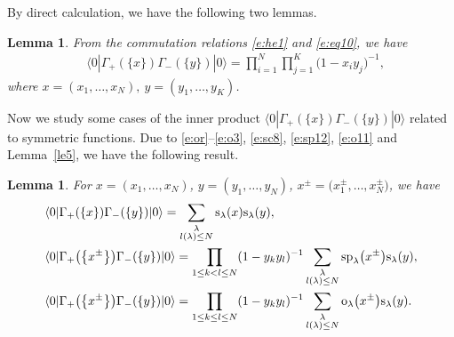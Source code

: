 \documentclass[pdftex]{sigma}
\numberwithin{equation}{section}
\newtheorem{Lemma}[Theorem]{Lemma}
\begin{document}
By direct calculation, we have the following two lemmas.
\begin{Lemma}\label{le} From the commutation relations \eqref{e:he1} and \eqref{e:eq10}, we have
\begin{align*}
&\langle 0|\Gamma_+(\{x\})\Gamma_-(\{y\})|0\rangle = \prod^N_{i=1}\prod^K_{j=1}\big(1-x_iy_j\big)^{-1},
\end{align*}
where $x=(x_1,\dots,x_N),~y=(y_1,\dots,y_K)$.
\end{Lemma}
Now we study some cases of the inner product $\langle 0|\Gamma_+(\{x\})\Gamma_-(\{y\})|0\rangle$ related to symmetric functions. Due to \eqref{e:or}--\eqref{e:o3}, \eqref{e:sc8}, \eqref{e:sp12}, \eqref{e:o11} and Lemma~\ref{le5}, we have the following result.
\begin{Lemma}\label{le6} For $x=(x_1,\dots,x_N)$, $y=(y_1,\dots,y_N)$, $x^{\pm}=\big(x^{\pm}_1,\dots,x^{\pm}_N\big)$, we have
\begin{align*}
&\langle 0|\Gamma_+(\{x\})\Gamma_-(\{y\})|0\rangle=\sum_{\substack{\lambda\\l(\lambda)\leq N}}{\rm s}_\lambda(x){\rm s}_\lambda(y),\\ %
&\langle 0|\Gamma_+\big(\big\{x^{\pm}\big\}\big)\Gamma_-(\{y\})|0\rangle=\prod_{1\leq k< l\leq N}(1-y_ky_l)^{-1}\sum_{\substack{\lambda\\l(\lambda)\leq N}}{\rm sp}_\lambda\big(x^{\pm}\big){\rm s}_\lambda(y),\\ %
&\langle 0|\Gamma_+\big(\big\{x^{\pm}\big\}\big)\Gamma_-(\{y\})|0\rangle=\prod_{1\leq k\leq l\leq N}(1-y_ky_l)^{-1}\sum_{\substack{\lambda\\l(\lambda)\leq N}}{\rm o}_\lambda\big(x^{\pm}\big){\rm s}_\lambda(y). %
\end{align*}
\end{Lemma}
\end{document}
